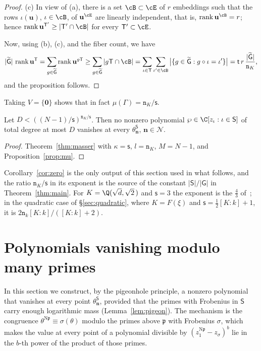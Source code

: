 \documentclass[11pt, reqno, twoside, letterpaper]{amsart}
\newcommand{\vn}{\mathbf{n}}
\newcommand{\vu}{\mathbf{u}}
\newcommand{\vzero}{\mathbf{0}}
\DeclareMathOperator{\rk}{rank}
\newcommand{\Nm}{\mathrm{N}}
\newcommand{\fp}{\mathfrak{p}}
\newcommand{\dk}{{\mathtt{n}_k}}
\newcommand{\dK}{{\mathtt{n}_K}}
\newcommand{\rou}{\xi}
\newcommand{\bxs}{N}
\newcommand{\dgb}{D}
\newcommand{\galKk}{\mathsf{G}}
\newcommand{\galL}{\widetilde{\mathsf{G}}}
\newcommand{\Kf}{K}
\newcommand{\lat}{\Gamma}
\newcommand{\poly}{\wp}
\newcommand{\Sset}{\mathsf{S}}
\newcommand{\emb}{\iota}
\newcommand{\nS}{\mathsf{s}}
\newcommand{\Tset}{\mathsf{T}}
\newcommand{\nT}{\mathsf{t}}
\newcommand{\cube}{\mathcal{N}}
\begin{document}
\begin{proof}
(c) In view of (a), there is a set $\cB\subset\cE$ of $r$ embeddings
such that the rows $\iota(\vu)$, $\iota\in\cB$, of $\vu^{\cE}$ are
linearly independent, that is, $\rk\vu^{\cB}=r$; hence
$\rk\vu^{\Tset'}\ge|\Tset'\cap\cB|$ for every $\Tset'\subset\cE$.

\medskip Now, using (b), (c), and the fiber count, we have
\[
|\galL|\,\rk\vu^{\Tset}=\sum_{g\in\galL}\rk\vu^{g\Tset}
\ge\sum_{g\in\galL}|g\Tset\cap\cB|
=\sum_{\iota\in\Tset}\sum_{\iota'\in\cB}
\big|\{g\in\galL:g\circ\iota=\iota'\}\big|
=\nT\,r\,\frac{|\galL|}{\dK},
\]
and the proposition follows.
\end{proof}

Taking $V=\{\vzero\}$ shows that in fact $\mu(\lat)=\dK/\nS$.

\begin{corollary}\label{cor:zero}
Let $\dgb<((\bxs-1)/\nS)^{\dK/\nS}$. Then no nonzero polynomial
$\poly\in\C[z_\emb:\emb\in\Sset]$ of total degree at most $\dgb$
vanishes at every $\theta_\vn^{\Sset}$, $\vn\in\cube$.
\end{corollary}

\begin{proof}
Theorem~\ref{thm:masser} with $\kappa=\nS$, $l=\dK$, $M=\bxs-1$, and
Proposition~\ref{prop:mu}.
\end{proof}

Corollary~\ref{cor:zero} is the only output of this section used in
what follows, and the ratio $\dK/\nS$ in its exponent is the source of
the constant $|\Sset|/|\galKk|$ in Theorem~\ref{thm:main}. For
$\Kf=\Q(\sqrt d,\sqrt 2\,)$ and $\nS=3$ the exponent is the $\tfrac43$
of~\cite{Ke}; in the quadratic case of \S\ref{sec:quadratic}, where
$\Kf=F(\rou)$ and $\nS=\tfrac12[\Kf:k]+1$, it is
$2\dk[\Kf:k]/([\Kf:k]+2)$.

\section{Polynomials vanishing modulo many primes}\label{sec:poly}

In this section we construct, by the pigeonhole principle, a nonzero
polynomial that vanishes at every point $\theta_\vn^{\Sset}$,
provided that the primes with Frobenius in $\Sset$ carry enough
logarithmic mass (Lemma~\ref{lem:pigeon}). The mechanism is the
congruence $\theta^{\Nm\fp}\equiv\sigma(\theta)$ modulo the primes
above $\fp$ with Frobenius $\sigma$, which makes the value at every
point of a polynomial divisible by $(z_1^{\Nm\fp}-z_\sigma)^b$ lie in
the $b$-th power of the product of those primes.
\end{document}
